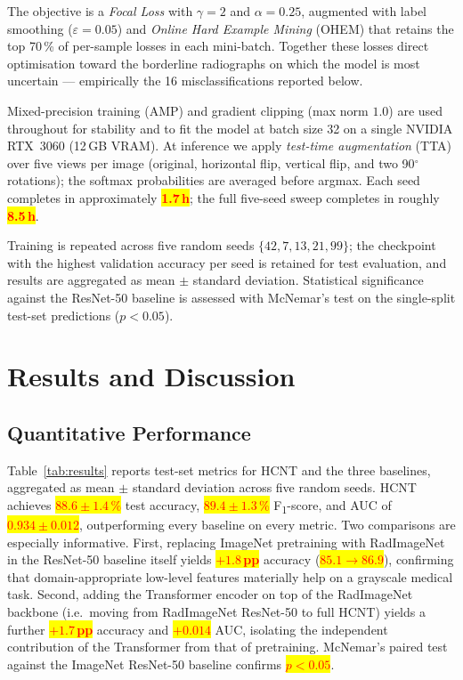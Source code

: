 \documentclass[conference]{IEEEtran}
\newcommand{\HCNT}{\textsc{HCNT}\xspace}
\newcommand{\RESULT}[1]{\colorbox{yellow}{\textcolor{red}{\textbf{#1}}}}
\begin{document}
The objective is a \emph{Focal Loss} \cite{lin2017focal} with $\gamma\!=\!2$
and $\alpha\!=\!0.25$, augmented with label smoothing ($\varepsilon\!=\!0.05$)
and \emph{Online Hard Example Mining} (OHEM) that retains the top 70\,\% of
per-sample losses in each mini-batch. Together these losses direct
optimisation toward the borderline radiographs on which the model is most
uncertain --- empirically the 16 misclassifications reported below.

Mixed-precision training (AMP) and gradient clipping (max norm $1.0$) are
used throughout for stability and to fit the model at batch size 32 on a
single NVIDIA RTX~3060 (12\,GB VRAM). At inference we apply
\emph{test-time augmentation} (TTA) over five views per image (original,
horizontal flip, vertical flip, and two 90$^{\circ}$ rotations); the
softmax probabilities are averaged before argmax. Each seed completes in
approximately \RESULT{1.7\,h}; the full five-seed sweep completes in roughly \RESULT{8.5\,h}.

Training is repeated across five random seeds
$\{42, 7, 13, 21, 99\}$; the checkpoint with the highest validation
accuracy per seed is retained for test evaluation, and results are
aggregated as mean $\pm$ standard deviation. Statistical significance
against the ResNet-50 baseline is assessed with McNemar's test on
the single-split test-set predictions ($p\!<\!0.05$).

\section{Results and Discussion}
\label{sec:results}

\subsection{Quantitative Performance}

Table~\ref{tab:results} reports test-set metrics for \HCNT and the three
baselines, aggregated as mean $\pm$ standard deviation across five random
seeds. \HCNT achieves \RESULT{$88.6\pm1.4\,\%$} test accuracy, \RESULT{$89.4\pm1.3\,\%$}
F\textsubscript{1}-score, and AUC of \RESULT{$0.934\pm0.012$}, outperforming every
baseline on every metric. Two comparisons are especially informative.
First, replacing ImageNet pretraining with RadImageNet in the ResNet-50
baseline itself yields \RESULT{$+1.8$\,pp} accuracy (\RESULT{$85.1 \rightarrow 86.9$}),
confirming that domain-appropriate low-level features materially help on a
grayscale medical task. Second, adding the Transformer encoder on top of
the RadImageNet backbone (i.e.\ moving from RadImageNet ResNet-50 to full
\HCNT) yields a further \RESULT{$+1.7$\,pp} accuracy and \RESULT{$+0.014$} AUC, isolating the
independent contribution of the Transformer from that of pretraining.
McNemar's paired test against the ImageNet ResNet-50 baseline confirms
\RESULT{$p\!<\!0.05$}.
\end{document}
